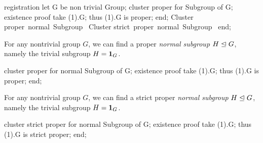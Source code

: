 \nwenddocs{}\endmoddef\nwstartdeflinemarkup{}\nwenddeflinemarkup
registration
  let G be non trivial Group;
  cluster proper for Subgroup of G;
  existence
  proof
    take (1).G;
    thus (1).G is proper;
  end;
  \LA{}Cluster \code{}proper\ normal\ Subgroup\edoc{}~{\nwtagstyle{}}\RA{}
  \LA{}Cluster \code{}strict\ proper\ normal\ Subgroup\edoc{}~{\nwtagstyle{}}\RA{}
end;
\nwendcode{}\nwdocspar

\begin{registration}
For any nontrivial group $G$, we can find a proper \emph{normal
subgroup} $H\trianglelefteq G$, namely the trivial subgroup
$H=\mathbf{1}_{G}$.
\end{registration}

\nwenddocs{}\endmoddef\nwstartdeflinemarkup{}\nwenddeflinemarkup
cluster proper for normal Subgroup of G;
existence
proof
  take (1).G;
  thus (1).G is proper;
end;
\nwendcode{}\nwdocspar

\begin{registration}
For any nontrivial group $G$, we can find a strict proper \emph{normal
subgroup} $H\trianglelefteq G$, namely the trivial subgroup
$H=\mathbf{1}_{G}$.
\end{registration}

\nwenddocs{}\endmoddef\nwstartdeflinemarkup{}\nwenddeflinemarkup
cluster strict proper for normal Subgroup of G;
existence
proof
  take (1).G;
  thus (1).G is strict proper;
end;
\nwendcode{}\nwdocspar


